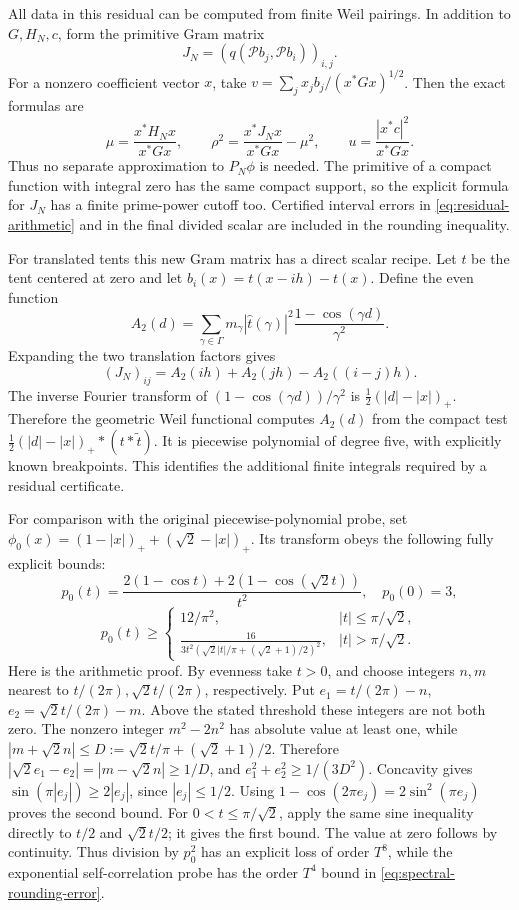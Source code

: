 All data in this residual can be computed from finite Weil pairings.
In addition to $G,H_N,c$, form the primitive Gram matrix
\[
 J_N=(q(\mathcal Pb_j,\mathcal Pb_i))_{i,j}.
\]
For a nonzero coefficient vector $x$, take
$v=\sum_jx_jb_j/(x^*Gx)^{1/2}$.  Then the exact formulas are
\begin{equation}
 \mu=\frac{x^*H_Nx}{x^*Gx},\qquad
 \rho^2=\frac{x^*J_Nx}{x^*Gx}-\mu^2,\qquad
 u=\frac{|x^*c|^2}{x^*Gx}.
 \label{eq:residual-arithmetic}
\end{equation}
Thus no separate approximation to $P_N\phi$ is needed.  The primitive
of a compact function with integral zero has the same compact support,
so the explicit formula for $J_N$ has a finite prime-power cutoff too.
Certified interval errors in \eqref{eq:residual-arithmetic} and in the
final divided scalar are included in the rounding inequality.

For translated tents this new Gram matrix has a direct scalar recipe.
Let $t$ be the tent centered at zero and let
$b_i(x)=t(x-ih)-t(x)$.  Define the even function
\[
 A_2(d)=\sum_{\gamma\in\Gamma}
      m_\gamma|\widehat t(\gamma)|^2
                      \frac{1-\cos(\gamma d)}{\gamma^2}.
\]
Expanding the two translation factors gives
\[
 (J_N)_{ij}=A_2(ih)+A_2(jh)-A_2((i-j)h).
\]
The inverse Fourier transform of
$(1-\cos(\gamma d))/\gamma^2$ is
$\tfrac12(|d|-|x|)_+$.  Therefore the geometric Weil functional
computes $A_2(d)$ from the compact test
$\tfrac12(|d|-|x|)_+*(t*\widetilde t)$.
It is piecewise polynomial of degree five, with explicitly known
breakpoints.  This identifies the additional finite integrals required
by a residual certificate.

For comparison with the original piecewise-polynomial probe, set
$\phi_0(x)=(1-|x|)_++(\sqrt2-|x|)_+$. Its transform obeys the
following fully explicit bounds:
\[
 p_0(t)=\frac{2(1-\cos t)+2(1-\cos(\sqrt2t))}{t^2},\quad p_0(0)=3,
\]
\begin{equation}
 p_0(t)\ge
 \begin{cases}
 12/\pi^2,&|t|\le\pi/\sqrt2,\\[2pt]
 \displaystyle\frac{16}{3t^2
     (\sqrt2|t|/\pi+(\sqrt2+1)/2)^2},&|t|>\pi/\sqrt2.
 \end{cases}
 \label{eq:two-tent-bound}
\end{equation}
Here is the arithmetic proof. By evenness take $t>0$, and choose
integers $n,m$ nearest to $t/(2\pi),\sqrt2t/(2\pi)$, respectively.
Put $e_1=t/(2\pi)-n$, $e_2=\sqrt2t/(2\pi)-m$. Above the stated
threshold these integers are not both zero. The nonzero integer
$m^2-2n^2$ has absolute value at least one, while
$|m+\sqrt2n|\le D:=\sqrt2t/\pi+(\sqrt2+1)/2$. Therefore
$|\sqrt2e_1-e_2|=|m-\sqrt2n|\ge1/D$, and
$e_1^2+e_2^2\ge1/(3D^2)$. Concavity gives
$\sin(\pi|e_j|)\ge2|e_j|$, since $|e_j|\le1/2$. Using
$1-\cos(2\pi e_j)=2\sin^2(\pi e_j)$ proves the second bound.
For $0<t\le\pi/\sqrt2$, apply the same sine inequality directly
to $t/2$ and $\sqrt2t/2$; it gives the first bound.
The value at zero follows by continuity. Thus division by $p_0^2$
has an explicit loss of order $T^8$, while the exponential
self-correlation probe has the order $T^4$ bound in
\eqref{eq:spectral-rounding-error}.

